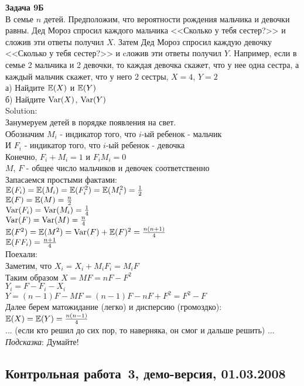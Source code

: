 \documentclass[pdftex,12pt,a4paper]{article}
\begin{document}
\textbf{Задача 9Б} \\
В семье $n$ детей. Предположим, что вероятности рождения мальчика и девочки равны. Дед Мороз спросил каждого мальчика <<Сколько у тебя сестер?>> и сложив эти ответы получил $X$. Затем Дед Мороз спросил каждую девочку <<Сколько у тебя сестер?>> и cложив эти ответы получил $Y$. Например, если в семье 2 мальчика и 2 девочки, то каждая девочка скажет, что у нее одна сестра, а каждый мальчик скажет, что у него 2 сестры, $X=4$, $Y=2$ \\
а) Найдите $\mathbb{E}(X)$ и $\mathbb{E}(Y)$ \\
б) Найдите $\operatorname{Var}(X)$, $\operatorname{Var}(Y)$ \\
Solution: \\
Занумеруем детей в порядке появления на свет. \\
Обозначим $M_{i}$ - индикатор того, что $i$-ый ребенок - мальчик \\
И $F_{i}$ - индикатор того, что $i$-ый ребенок - девочка \\
Конечно, $F_{i}+M_{i}=1$ и $F_{i}M_{i}=0$ \\
$M$, $F$ - общее число мальчиков и девочек соответственно \\
Запасаемся простыми фактами: \\
$\mathbb{E}(F_{i})=\mathbb{E}(M_{i})=\mathbb{E}(F_{i}^{2})=\mathbb{E}(M_{i}^{2})=\frac{1}{2}$ \\
$\mathbb{E}(F)=\mathbb{E}(M)=\frac{n}{2}$ \\
$\operatorname{Var}(F_{i})=\operatorname{Var}(M_{i})=\frac{1}{4}$ \\
$\operatorname{Var}(F)=\operatorname{Var}(M)=\frac{n}{4}$ \\
$\mathbb{E}(F^{2})=\mathbb{E}(M^{2})=\operatorname{Var}(F)+\mathbb{E}(F)^{2}=\frac{n(n+1)}{4}$ \\
$\mathbb{E}(FF_{i})=\frac{n+1}{4}$ \\
Поехали: \\
Заметим, что $X_{i}=X_{i}+M_{i}F_{i}=M_{i}F$ \\
Таким образом $X=MF=nF-F^{2}$ \\
$Y_{i}=F-F_{i}-X_{i}$ \\
$Y=(n-1)F-MF=(n-1)F-nF+F^{2}=F^{2}-F$ \\
Далее берем матожидание (легко) и дисперсию (громоздко): \\
$\mathbb{E}(X)=\mathbb{E}(Y)=\frac{n(n-1)}{4}$ \\
... (если кто решил до сих пор, то наверняка, он смог и дальше решить) ...\\


\emph{Подсказка}: Думайте! \\


\subsection{Контрольная работа \No\,3, демо-версия, 01.03.2008}
\end{document}
